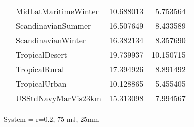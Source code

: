\begin{tabular}{llrr}
             & MidLatMaritimeWinter &  10.688013 &   5.753564 \\
             & ScandinavianSummer &  16.507649 &   8.433589 \\
             & ScandinavianWinter &  16.382134 &   8.357690 \\
             & TropicalDesert &  19.739937 &  10.150715 \\
             & TropicalRural &  17.394926 &   8.891492 \\
             & TropicalUrban &  10.128865 &   5.455405 \\
             & USStdNavyMarVis23km &  15.313098 &   7.994567 \\
\bottomrule
\end{tabular}


\clearpage
System = r=0.2, 75 mJ, 25mm

